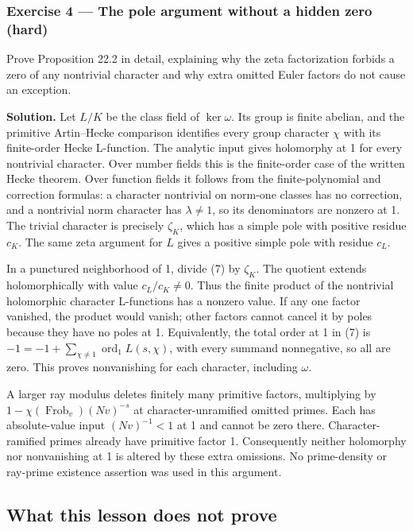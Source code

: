 \documentclass[11pt,a4paper]{article}
\begin{document}
\subsubsection{Exercise 4 --- The pole argument without a hidden zero
(hard)}\label{exercise-4-the-pole-argument-without-a-hidden-zero-hard}

Prove Proposition 22.2 in detail, explaining why the zeta factorization
forbids a zero of any nontrivial character and why extra omitted Euler
factors do not cause an exception.

\textbf{Solution.} Let \(L/K\) be the class field of \(\ker\omega\). Its
group is finite abelian, and the primitive Artin--Hecke comparison
identifies every group character \(\chi\) with its finite-order Hecke
L-function. The analytic input gives holomorphy at 1 for every
nontrivial character. Over number fields this is the finite-order case
of the written Hecke theorem. Over function fields it follows from the
finite-polynomial and correction formulas: a character nontrivial on
norm-one classes has no correction, and a nontrivial norm character has
\(\lambda\ne1\), so its denominators are nonzero at 1. The trivial
character is precisely \(\zeta_K\), which has a simple pole with
positive residue \(c_K\). The same zeta argument for \(L\) gives a
positive simple pole with residue \(c_L\).

In a punctured neighborhood of 1, divide (7) by \(\zeta_K\). The
quotient extends holomorphically with value \(c_L/c_K\ne0\). Thus the
finite product of the nontrivial holomorphic character L-functions has a
nonzero value. If any one factor vanished, the product would vanish;
other factors cannot cancel it by poles because they have no poles at 1.
Equivalently, the total order at 1 in (7) is
\(-1=-1+\sum_{\chi\ne1}\operatorname{ord}_1L(s,\chi)\), with every
summand nonnegative, so all are zero. This proves nonvanishing for each
character, including \(\omega\).

A larger ray modulus deletes finitely many primitive factors,
multiplying by \(1-\chi(\operatorname{Frob}_v)(Nv)^{-s}\) at
character-unramified omitted primes. Each has absolute-value input
\((Nv)^{-1}<1\) at 1 and cannot be zero there. Character-ramified primes
already have primitive factor 1. Consequently neither holomorphy nor
nonvanishing at 1 is altered by these extra omissions. No prime-density
or ray-prime existence assertion was used in this argument.

\subsection{What this lesson does not
prove}\label{what-this-lesson-does-not-prove}
\end{document}

